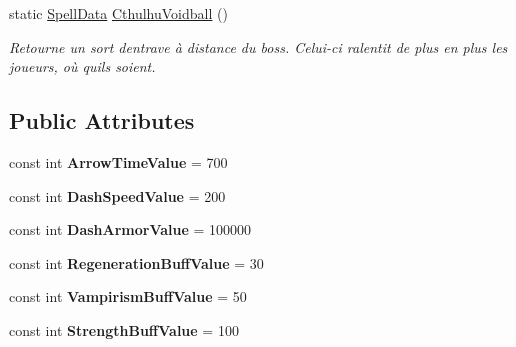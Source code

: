 \begin{DoxyCompactItemize}
static \hyperlink{class_tentacle_slicers_1_1spells_1_1_spell_data}{Spell\+Data} \hyperlink{class_tentacle_slicers_1_1customs_1_1_spells_a748b59ef695b5ffc37dc3689d335cc9b}{Cthulhu\+Voidball} ()
\begin{DoxyCompactList}\small\item\em Retourne un sort d\textquotesingle{}entrave à distance du boss. Celui-\/ci ralentit de plus en plus les joueurs, où qu\textquotesingle{}ils soient. \end{DoxyCompactList}\end{DoxyCompactItemize}
\subsection*{Public Attributes}
\begin{DoxyCompactItemize}
\item 
\mbox{\label{class_tentacle_slicers_1_1customs_1_1_spells_a96c454ab76f463210d5acdc411f8e31b}} 
const int {\bfseries Arrow\+Time\+Value} = 700
\item 
\mbox{\label{class_tentacle_slicers_1_1customs_1_1_spells_a1cffa862e800a6892f7624694c0e4b54}} 
const int {\bfseries Dash\+Speed\+Value} = 200
\item 
\mbox{\label{class_tentacle_slicers_1_1customs_1_1_spells_ace03ac7383ce8ecbe007278c596c6162}} 
const int {\bfseries Dash\+Armor\+Value} = 100000
\item 
\mbox{\label{class_tentacle_slicers_1_1customs_1_1_spells_a8c792b81b3ff761a254ba716d91df9d3}} 
const int {\bfseries Regeneration\+Buff\+Value} = 30
\item 
\mbox{\label{class_tentacle_slicers_1_1customs_1_1_spells_a9c33916632502b24cce0dd97cb871050}} 
const int {\bfseries Vampirism\+Buff\+Value} = 50
\item 
\mbox{\label{class_tentacle_slicers_1_1customs_1_1_spells_a314847ec4415a3a31bfafe42506c271d}} 
const int {\bfseries Strength\+Buff\+Value} = 100
\item 
\mbox{\label{class_tentacle_slicers_1_1customs_1_1_spells_aaf81136155bc451f6293733295068790}} 

\end{DoxyCompactItemize}
